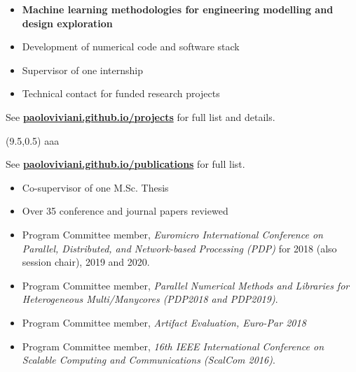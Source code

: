\documentclass[10pt,a4paper]{altacv}
\begin{document}
\divider

\begin{itemize}
\item \textbf{Machine learning methodologies for engineering modelling and design exploration}
\item Development of numerical code and software stack
\item Supervisor of one internship
\item Technical contact for funded research projects
\end{itemize}

\divider

See \href{http://paoloviviani.github.io/projects}{\color{accent}\textbf{paoloviviani.github.io/projects}} for full list and details.
\medskip


\clearpage

\vspace{0.5cm}
\begin{textblock}{10}(9.5,0.5)
  \centering
	aaa
  \vspace{278mm}
\end{textblock}

\renewcommand*{\bibfont}{\small}
See \href{https://paoloviviani.github.io/publications}{\color{accent}\textbf{paoloviviani.github.io/publications}} for full list.
\medskip
\medskip
\nocite{*}
\medskip
\printbibliography[heading=none,sorting=none]

\divider

\begin{itemize}
\item Co-supervisor of one M.Sc. Thesis
\item Over 35 conference and journal papers reviewed
\item Program Committee member, \textit{Euromicro International Conference on Parallel, Distributed, and Network-based Processing (PDP)} for 2018 (also session chair), 2019 and 2020.
\item Program Committee member, \textit{Parallel Numerical Methods and Libraries for Heterogeneous Multi/Manycores (PDP2018 and PDP2019)}.
\item Program Committee member, \textit{Artifact Evaluation, Euro-Par 2018}
\item Program Committee member, \textit{16th IEEE International Conference on Scalable Computing and Communications (ScalCom 2016)}.
\end{itemize}
\end{document}
